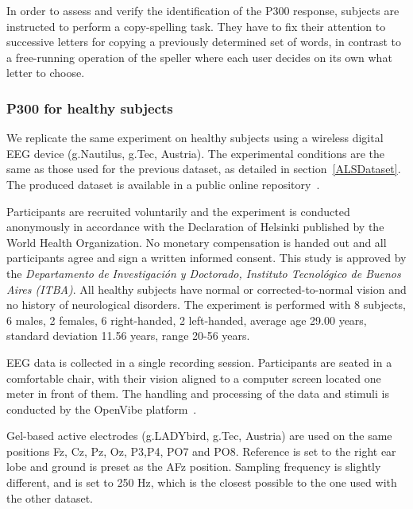 \documentclass[utf8]{frontiersSCNS} %
\begin{document}
In order to assess and verify the identification of the P300 response, subjects are instructed to perform a copy-spelling task. They have to fix their attention to successive letters for copying a previously determined set of words, in contrast to a free-running operation of the speller where each user decides on its own what letter to choose.

\subsubsection{P300 for healthy subjects}

We replicate the same experiment on healthy subjects using a wireless digital EEG device (g.Nautilus, g.Tec, Austria).  The experimental conditions are the same as those used for the previous dataset, as detailed in section~\ref{ALSDataset}.  The produced dataset is available in a public online repository~\citep{owndataset}.

Participants are recruited voluntarily and the experiment is conducted anonymously in accordance with the Declaration of Helsinki published by the World Health Organization.  No monetary compensation is handed out and all participants agree and sign a written informed consent.  This study is approved by the \textit{Departamento de Investigación y Doctorado, Instituto Tecnológico de Buenos Aires (ITBA)}.  All healthy subjects have normal or corrected-to-normal vision and no history of neurological disorders. The experiment is performed with 8 subjects, 6 males, 2 females, 6 right-handed, 2 left-handed, average age 29.00 years, standard deviation  11.56 years, range 20-56 years.

EEG data is collected in a single recording session. Participants are seated in a comfortable chair, with their vision aligned to a computer screen located one meter in front of them.  The handling and processing of the data and stimuli is conducted by the OpenVibe platform~\citep{Renard2010}. 

Gel-based active electrodes (g.LADYbird, g.Tec, Austria) are used on the same positions Fz, Cz, Pz, Oz, P3,P4, PO7 and PO8.  Reference is set to the right ear lobe and ground is preset as the AFz position.   Sampling frequency is slightly different, and is set to 250 Hz, which is the closest possible to the one used with the other dataset.


\end{document}
